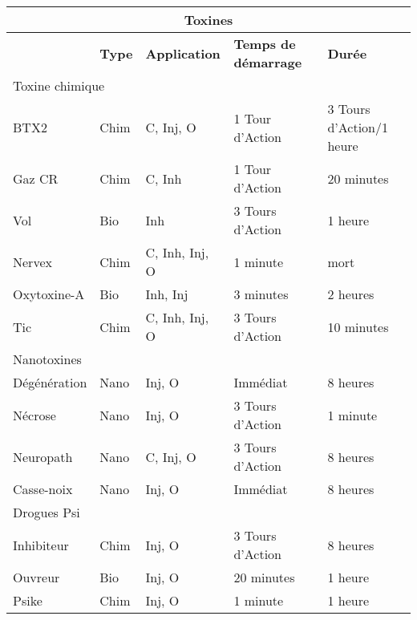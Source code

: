 \begin{table} 

\begin{tabular}{|l|l|l|l|l|} \hline

\multicolumn{5}{|c|}{\textbf{Toxines}} \\ \hline

&\textbf{Type}	&\textbf{Application}	&\textbf{Temps de démarrage}	&\textbf{Durée} \\ \hline

\multicolumn{5}{|l|}{Toxine chimique} \\ \hline

BTX2	&Chim	&C, Inj, O	&1 Tour d'Action	&3 Tours d'Action/1 heure \\ \hline

Gaz CR	&Chim	&C, Inh	&1 Tour d'Action	&20 minutes \\ \hline

Vol	&Bio	&Inh	&3 Tours d'Action	&1 heure \\ \hline

Nervex	&Chim	&C, Inh, Inj, O	&1 minute	&mort \\ \hline

Oxytoxine-A	&Bio	&Inh, Inj	&3 minutes	&2 heures \\ \hline

Tic	&Chim	&C, Inh, Inj, O	&3 Tours d'Action	&10 minutes \\ \hline

\multicolumn{5}{|l|}{Nanotoxines} \\ \hline

Dégénération	&Nano	&Inj, O	&Immédiat	&8 heures \\ \hline

Nécrose	&Nano	&Inj, O	&3 Tours d'Action	&1 minute \\ \hline

Neuropath	&Nano	&C, Inj, O	&3 Tours d'Action	&8 heures \\ \hline

Casse-noix	&Nano	&Inj, O	&Immédiat	&8 heures \\ \hline

\multicolumn{5}{|l|}{Drogues Psi} \\ \hline

Inhibiteur	&Chim	&Inj, O	&3 Tours d'Action	&8 heures \\ \hline

Ouvreur	&Bio	&Inj, O	&20 minutes	&1 heure \\ \hline

Psike	&Chim	&Inj, O	&1 minute	&1 heure \\ \hline

\end{tabular} \label{tab:Toxins} \end{table} 

